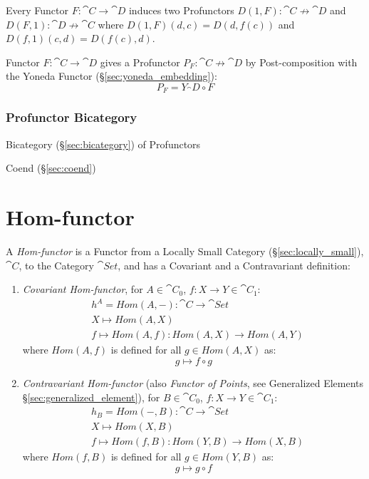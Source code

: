 Every Functor $F : \cat{C} \rightarrow \cat{D}$ induces two
Profunctors $D(1,F) : \cat{C} \nrightarrow \cat{D}$ and $D(F,1)
: \cat{D} \nrightarrow \cat{C}$ where $D(1,F)(d,c) = D(d,f(c))$
and $D(f,1)(c,d) = D(f(c),d)$.

Functor $F : \cat{C} \rightarrow \cat{D}$ gives a Profunctor $P_F :
\cat{C} \nrightarrow \cat{D}$ by Post-composition with the Yoneda
Functor (\S\ref{sec:yoneda_embedding}):
\[
  P_F = Y_\cat{D} \circ F
\]



\subsubsection{Profunctor Bicategory}\label{sec:profunctor_bicategory}

Bicategory (\S\ref{sec:bicategory}) of Profunctors

Coend (\S\ref{sec:coend})



\section{Hom-functor}\label{sec:hom_functor}

A \emph{Hom-functor} is a Functor from a Locally Small Category
(\S\ref{sec:locally_small}), $\cat{C}$, to the Category $\cat{Set}$,
and has a Covariant and a Contravariant definition:

\begin{enumerate}
  \item \emph{Covariant Hom-functor}, for $A \in \cat{C}_0$, $f : X
    \rightarrow Y \in \cat{C}_1$:
\[
\begin{split}
  & h^A = Hom(A,-) : \cat{C} \rightarrow \cat{Set} \\
  & X \mapsto Hom(A,X) \\
  & f \mapsto Hom(A,f) : Hom(A,X) \rightarrow Hom(A,Y)
\end{split}
\]
  where $Hom(A,f)$ is defined for all $g \in Hom(A,X)$ as:
\[
  g \mapsto f \circ g
\]

  \item \emph{Contravariant Hom-functor} (also \emph{Functor of
    Points}, see Generalized Elements
    \S\ref{sec:generalized_element}), for $B \in \cat{C}_0$, $f : X
    \rightarrow Y \in \cat{C}_1$:
\[
\begin{split}
  & h_B = Hom(-,B) : \cat{C} \rightarrow \cat{Set} \\
  & X \mapsto Hom(X,B) \\
  & f \mapsto Hom(f,B) : Hom(Y,B) \rightarrow Hom(X,B)
\end{split}
\]
  where $Hom(f,B)$ is defined for all $g \in Hom(Y,B)$ as:
\[
  g \mapsto g \circ f
\]
\end{enumerate}

